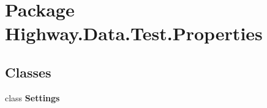 \hypertarget{namespace_highway_1_1_data_1_1_test_1_1_properties}{\section{Package Highway.\-Data.\-Test.\-Properties}
\label{namespace_highway_1_1_data_1_1_test_1_1_properties}
}
\subsection*{Classes}
\begin{DoxyCompactItemize}
\item 
class {\bfseries Settings}
\end{DoxyCompactItemize}
